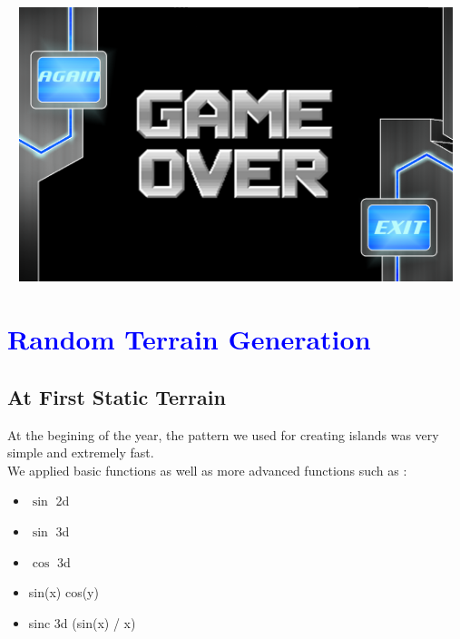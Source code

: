 \documentclass[article]{report}         %
\begin{document}
    \includegraphics[width=15cm, height=8cm]{images/Menus/death_screen_normal.png}


    \chapter{\textcolor{blue}{Random Terrain Generation}}
      \section{At First Static Terrain}
        At the begining of the year, the pattern we used for creating islands was very simple and extremely fast.\\
        We applied basic functions as well as more advanced functions such as :

        \begin{itemize}
          
          \item $\sin$ 2d
          \item $\sin$ 3d
          \item $\cos$ 3d
          \item sin(x) cos(y)
          \item sinc 3d (sin(x) / x)
        \end{itemize}
\end{document}

